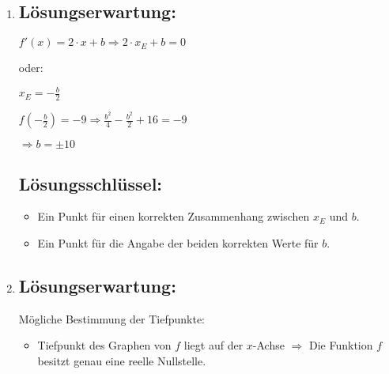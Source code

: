 \begin{langesbeispiel}
{\begin{enumerate}
	$7=(-1)^2+b\cdot (-1)+16 \Rightarrow -10=-b$
	
	$b=10$\leer
	
	$f'(-1)=2\cdot (-1)+10=8$
	
	\subsection{Lösungsschlüssel:}
	\begin{itemize}
		\item Ein Ausgleichspunkt für die korrekte Angabe des Parameters $b$.
		\item Ein Punkt für die korrekte Angabe der Steigung der Funktion $f$ an der Stelle $x = -1$.
	\end{itemize}
	
	\item \subsection{Lösungserwartung:}
			
		$f'(x)=2\cdot x+b \Rightarrow 2\cdot x_E+b=0$
		
		oder:
		
		$x_E=-\frac{b}{2}$
		
		$f\left(-\frac{b}{2}\right)=-9 \Rightarrow\frac{b^2}{4}-\frac{b^2}{2}+16=-9$
		
		$\Rightarrow b=\pm 10$

	\subsection{Lösungsschlüssel:}
	
\begin{itemize}
	\item Ein Punkt für einen korrekten Zusammenhang zwischen $x_E$ und $b$.
	\item Ein Punkt für die Angabe der beiden korrekten Werte für $b$.
\end{itemize}

\item \subsection{Lösungserwartung:}

	Mögliche Bestimmung der Tiefpunkte:
	
	\begin{itemize}
		\item Tiefpunkt des Graphen von $f$ liegt auf der $x$-Achse $\Rightarrow$ Die Funktion $f$ besitzt genau eine reelle Nullstelle.
		

\end{itemize}
\end{enumerate}}
\end{langesbeispiel}

